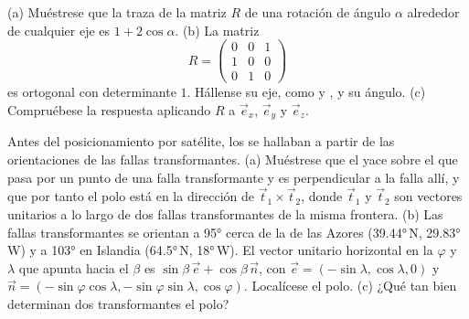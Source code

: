 \begin{exercise}[$\star\star\star$]\label{exo:b1:plate-kinematics:10}
(a) Muéstrese que la traza de la matriz $R$ de una rotación de ángulo $\alpha$ alrededor de cualquier eje es $1 + 2\cos\alpha$. (b) La matriz
\[
  R = \begin{pmatrix} 0 & 0 & 1\\ 1 & 0 & 0\\ 0 & 1 & 0\end{pmatrix}
\]
es ortogonal con determinante $1$. Hállense su eje, como  y , y su ángulo. (c) Compruébese la respuesta aplicando $R$ a
$\vec e_x$, $\vec e_y$ y $\vec e_z$.
\end{exercise}

\begin{exercise}[$\star\star\star$]\label{exo:b1:plate-kinematics:11}
Antes del posicionamiento por satélite, los  se hallaban a partir de las orientaciones de las fallas transformantes. (a)
Muéstrese que el  yace sobre el  que pasa por un punto de una falla transformante y es perpendicular a la
falla allí, y que por tanto el polo está en la dirección de $\vec t_1\times\vec t_2$, donde $\vec t_1$ y $\vec t_2$ son vectores unitarios
a lo largo de dos fallas transformantes de la misma frontera.
(b) Las fallas transformantes se orientan a \ang{95} cerca de la  de las Azores (\ang{39.44}\,N, \ang{29.83}\,W) y a
\ang{103} en Islandia (\ang{64.5}\,N, \ang{18}\,W). El vector unitario horizontal en la  $\varphi$ y  $\lambda$ que apunta
hacia el  $\beta$ es $\sin\beta\,\vec e +
\cos\beta\,\vec n$, con $\vec e = (-\sin\lambda, \cos\lambda, 0)$ y $\vec n =
(-\sin\varphi\cos\lambda, -\sin\varphi\sin\lambda, \cos\varphi)$. Localícese el polo. (c) ¿Qué tan bien determinan dos transformantes el polo?
\end{exercise}

